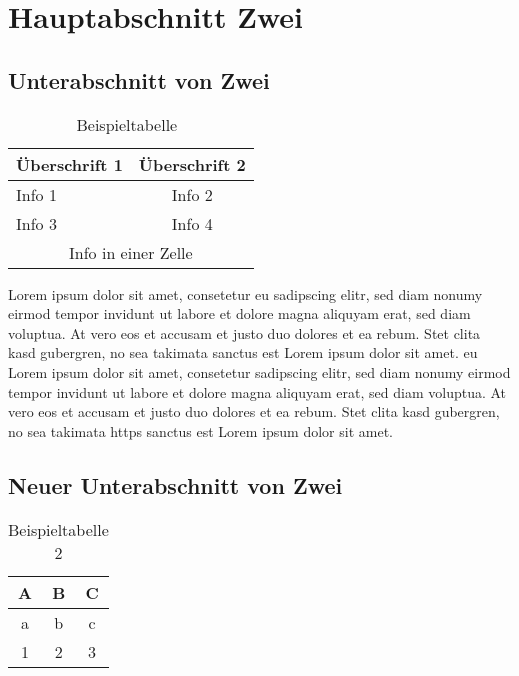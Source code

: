 \section{Hauptabschnitt Zwei}\label{hauptabschnitt}

\Blindtext
\Blindtext

\subsection{Unterabschnitt von Zwei}\label{unterabschnitt_1}

\Blindtext
\Blindtext
\Blindtext
\begin{table}[!ht]
  \centering
    \caption[Beispieltabelle]{Beispieltabelle~\cite[S.400]{KnutThea2009}}
    \label{table:Beispieltabelle}
    \begin{tabular}{ | l | c | }
      \hline
      Überschrift 1 & Überschrift 2 \\ \hline 
      Info 1 & Info 2 \\ \hline
      Info 3 & Info 4 \\ \hline
      \hline
      \multicolumn{2}{|c|}{Info in einer Zelle} \\
      \hline
    \end{tabular}
  \end{table}
\Blindtext


Lorem ipsum dolor sit amet, consetetur \ac{eu} sadipscing elitr, sed diam nonumy eirmod tempor invidunt ut labore et dolore magna aliquyam erat, sed diam voluptua. At vero eos et accusam et justo duo dolores et ea rebum. Stet clita 
kasd gubergren, no sea takimata sanctus est Lorem ipsum dolor sit amet. \ac{eu} Lorem ipsum dolor sit amet, consetetur sadipscing elitr, sed diam nonumy eirmod tempor invidunt ut labore et dolore magna aliquyam erat, sed diam voluptua. 
At vero eos et accusam et justo duo dolores et ea rebum. Stet clita kasd gubergren, no sea takimata \ac{https} sanctus est Lorem ipsum dolor sit amet.

\subsection{Neuer Unterabschnitt von Zwei}\label{unterabschnitt_2}

\Blindtext
  \begin{table}[!ht]
    \centering
    \caption{Beispieltabelle 2}
    \label{table:Beispieltabelle_2}
  \begin{tabular}{ccc}\toprule
    A&B&C \\ \midrule
    a&b&c \\ \cmidrule{1-3}
    1&2&3\\ \bottomrule
    \end{tabular}
  \end{table}
\Blindtext
\Blindtext



